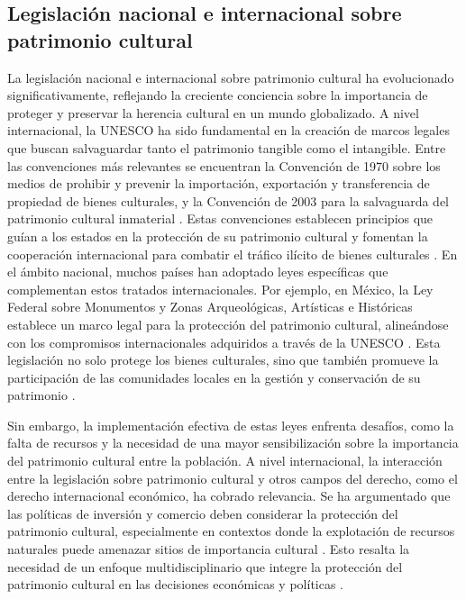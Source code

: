 \documentclass[
  spanish,
  11pt,
  a4paper,
]{scrbook}
\begin{document}
\subsection*{Legislación nacional e internacional sobre patrimonio
cultural}\label{legislaciuxf3n-nacional-e-internacional-sobre-patrimonio-cultural}

La legislación nacional e internacional sobre patrimonio cultural ha
evolucionado significativamente, reflejando la creciente conciencia
sobre la importancia de proteger y preservar la herencia cultural en un
mundo globalizado. A nivel internacional, la UNESCO ha sido fundamental
en la creación de marcos legales que buscan salvaguardar tanto el
patrimonio tangible como el intangible. Entre las convenciones más
relevantes se encuentran la Convención de 1970 sobre los medios de
prohibir y prevenir la importación, exportación y transferencia de
propiedad de bienes culturales, y la Convención de 2003 para la
salvaguarda del patrimonio cultural inmaterial
\autocite{Dundler2019,Zombory2022}. Estas convenciones establecen
principios que guían a los estados en la protección de su patrimonio
cultural y fomentan la cooperación internacional para combatir el
tráfico ilícito de bienes culturales \autocite{Dundler2019,Zombory2022}.
En el ámbito nacional, muchos países han adoptado leyes específicas que
complementan estos tratados internacionales. Por ejemplo, en México, la
Ley Federal sobre Monumentos y Zonas Arqueológicas, Artísticas e
Históricas establece un marco legal para la protección del patrimonio
cultural, alineándose con los compromisos internacionales adquiridos a
través de la UNESCO \autocite{Bassani2017}. Esta legislación no solo
protege los bienes culturales, sino que también promueve la
participación de las comunidades locales en la gestión y conservación de
su patrimonio \autocite{Bassani2017}.

Sin embargo, la implementación efectiva de estas leyes enfrenta
desafíos, como la falta de recursos y la necesidad de una mayor
sensibilización sobre la importancia del patrimonio cultural entre la
población. A nivel internacional, la interacción entre la legislación
sobre patrimonio cultural y otros campos del derecho, como el derecho
internacional económico, ha cobrado relevancia. Se ha argumentado que
las políticas de inversión y comercio deben considerar la protección del
patrimonio cultural, especialmente en contextos donde la explotación de
recursos naturales puede amenazar sitios de importancia cultural
\autocite{Vadi2015}. Esto resalta la necesidad de un enfoque
multidisciplinario que integre la protección del patrimonio cultural en
las decisiones económicas y políticas \autocite{Vadi2015}.
\end{document}

